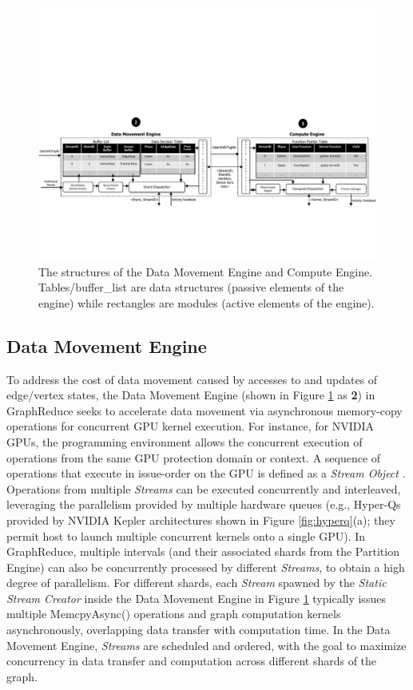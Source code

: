 \begin{figure}[t]
\centering
\includegraphics[width=\textwidth,height=\textheight,keepaspectratio]{figures/big_new.pdf}
\caption{ The structures of the Data Movement Engine and Compute Engine. Tables/buffer\_list are data structures (passive elements of the engine) while rectangles are modules (active elements of the engine).}
\label{fig:big_new}
\end{figure}


\subsection{Data Movement Engine}
\label{movement}


To address the cost of data movement caused by accesses to and updates of edge/vertex states, the Data Movement Engine 
(shown in Figure \ref{fig:big_new} as \textbf{2}) in GraphReduce seeks to accelerate data movement via asynchronous memory-copy operations for concurrent GPU kernel execution. For instance, for NVIDIA GPUs, the programming environment 
allows the concurrent execution of operations from the same GPU protection domain or context. A sequence of operations 
that execute in issue-order on the GPU is defined as a \textit{Stream Object} \cite{cuda7}. Operations from multiple \textit{Streams} 
can be executed concurrently and interleaved, leveraging the parallelism provided by multiple hardware queues (e.g., Hyper-Qs \cite{kepler}
provided by NVIDIA Kepler architectures shown in Figure \ref{fig:hyperq}(a); they permit host to launch multiple concurrent 
kernels onto a single GPU). In GraphReduce, multiple intervals (and their associated shards from the Partition Engine) can also be 
concurrently processed by different \textit{Streams}, to obtain a high degree of parallelism. For different shards,
each \textit{Stream} spawned by the \textit{Static Stream Creator} inside the Data Movement Engine in Figure \ref{fig:big_new} typically issues multiple MemcpyAsync() 
operations and graph computation kernels asynchronously, overlapping data transfer with computation time. In the Data Movement Engine, 
\textit{Streams} are scheduled and ordered, with the goal to maximize concurrency in data transfer and computation 
across different shards of the graph. 

